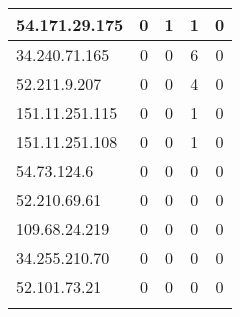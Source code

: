 \documentclass{article}
\begin{document}
\begin{longtable}{|>{\raggedright\arraybackslash}p{3cm}|c|c|c|c|}
    
    \rowcolor{lightred} %
    
    54.171.29.175 & 0 & 1 & 1 & 0 \\
    \hline
    
    
    \rowcolor{lightyellow} %
    
    34.240.71.165 & 0 & 0 & 6 & 0 \\
    \hline
    
    
    \rowcolor{lightyellow} %
    
    52.211.9.207 & 0 & 0 & 4 & 0 \\
    \hline
    
    
    \rowcolor{lightyellow} %
    
    151.11.251.115 & 0 & 0 & 1 & 0 \\
    \hline
    
    
    \rowcolor{lightyellow} %
    
    151.11.251.108 & 0 & 0 & 1 & 0 \\
    \hline
    
    
    \rowcolor{lightgreen} %
    
    54.73.124.6 & 0 & 0 & 0 & 0 \\
    \hline
    
    
    \rowcolor{lightgreen} %
    
    52.210.69.61 & 0 & 0 & 0 & 0 \\
    \hline
    
    
    \rowcolor{lightgreen} %
    
    109.68.24.219 & 0 & 0 & 0 & 0 \\
    \hline
    
    
    \rowcolor{lightgreen} %
    
    34.255.210.70 & 0 & 0 & 0 & 0 \\
    \hline
    
    
    \rowcolor{lightgreen} %
    
    52.101.73.21 & 0 & 0 & 0 & 0 \\
    \hline
    
    
    \rowcolor{lightgreen} %
    

\end{longtable}
\end{document}
